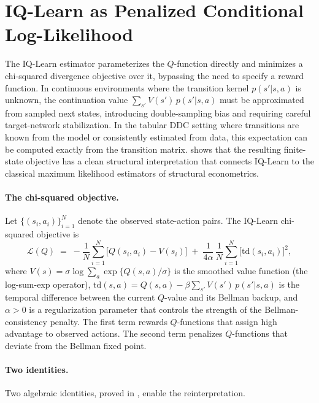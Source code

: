 \section{IQ-Learn as Penalized Conditional Log-Likelihood}
\label{sec:iq_learn}

The IQ-Learn estimator \citep{garg2021} parameterizes the $Q$-function directly and minimizes a chi-squared divergence objective over it, bypassing the need to specify a reward function. In continuous environments where the transition kernel $p(s'|s,a)$ is unknown, the continuation value $\sum_{s'} V(s')\,p(s'|s,a)$ must be approximated from sampled next states, introducing double-sampling bias and requiring careful target-network stabilization. In the tabular DDC setting where transitions are known from the model or consistently estimated from data, this expectation can be computed exactly from the transition matrix. \citet{rawat2026} shows that the resulting finite-state objective has a clean structural interpretation that connects IQ-Learn to the classical maximum likelihood estimators of structural econometrics.

\paragraph{The chi-squared objective.}
Let $\{(s_i, a_i)\}_{i=1}^N$ denote the observed state-action pairs. The IQ-Learn chi-squared objective is
\begin{equation}
\label{eq:iq_obj}
\mathcal{L}(Q) \;=\; -\frac{1}{N}\sum_{i=1}^{N}\bigl[Q(s_i,a_i) - V(s_i)\bigr] \;+\; \frac{1}{4\alpha}\,\frac{1}{N}\sum_{i=1}^{N}\bigl[\mathrm{td}(s_i,a_i)\bigr]^2,
\end{equation}
where $V(s) = \sigma\log\sum_a \exp\{Q(s,a)/\sigma\}$ is the smoothed value function (the log-sum-exp operator), $\mathrm{td}(s,a) = Q(s,a) - \beta\sum_{s'}V(s')\,p(s'|s,a)$ is the temporal difference between the current $Q$-value and its Bellman backup, and $\alpha > 0$ is a regularization parameter that controls the strength of the Bellman-consistency penalty. The first term rewards $Q$-functions that assign high advantage to observed actions. The second term penalizes $Q$-functions that deviate from the Bellman fixed point.

\paragraph{Two identities.}
Two algebraic identities, proved in \citet{rawat2026}, enable the reinterpretation.

